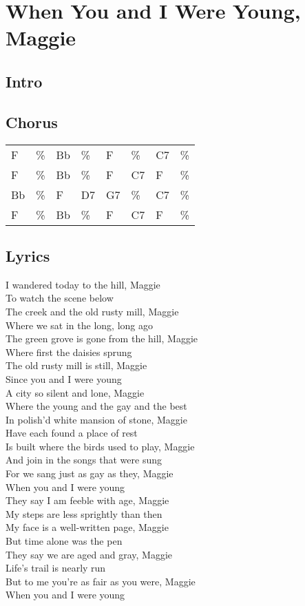\section{When You and I Were Young, Maggie}


\subsection*{Intro}


\subsection*{Chorus}


\begin{tabular}{l l l l l l l l}
F & \% & Bb & \% & F & \% & C7 & \% \\ 
F & \% & Bb & \% & F & C7 & F & \% \\ 
Bb & \% & F & D7 & G7 & \% & C7 & \% \\ 
F & \% & Bb & \% & F & C7 & F & \% \\ 
\end{tabular}


\subsection*{Lyrics}


I wandered today to the hill, Maggie \\ 
To watch the scene below \\ 
The creek and the old rusty mill, Maggie \\ 
Where we sat in the long, long ago \\ 
The green grove is gone from the hill, Maggie \\ 
Where first the daisies sprung \\ 
The old rusty mill is still, Maggie \\ 
Since you and I were young \\ 

A city so silent and lone, Maggie \\ 
Where the young and the gay and the best \\ 
In polish'd white mansion of stone, Maggie \\ 
Have each found a place of rest \\ 
Is built where the birds used to play, Maggie \\ 
And join in the songs that were sung \\ 
For we sang just as gay as they, Maggie \\ 
When you and I were young \\ 

They say I am feeble with age, Maggie \\ 
My steps are less sprightly than then \\ 
My face is a well-written page, Maggie \\ 
But time alone was the pen \\ 
They say we are aged and gray, Maggie \\ 
Life's trail is nearly run \\ 
But to me you're as fair as you were, Maggie \\ 
When you and I were young \\ 
